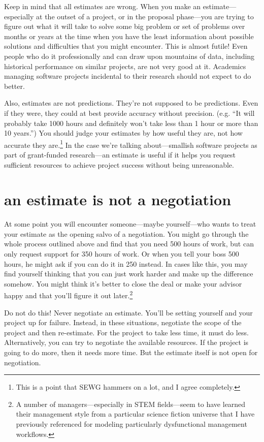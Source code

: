 \documentclass[12pt,oneside]{book}
\begin{document}
Keep in mind that all estimates are wrong. When you make an estimate---especially at the outset of a project, or in the proposal phase---you are trying to figure out what it will take to solve some big problem or set of problems over months or years at the time when you have the least information about possible solutions and difficulties that you might encounter. This is almost futile! Even people who do it professionally and can draw upon mountains of data, including historical performance on similar projects, are not very good at it. Academics managing software projects incidental to their research should not expect to do better.

Also, estimates are not predictions. They're not supposed to be predictions. Even if they were, they could at best provide accuracy without precision. (e.g. ``It will probably take 1000 hours and definitely won't take less than 1 hour or more than 10 years.'') You should judge your estimates by how useful they are, not how accurate they are.\footnote{This is a point that SEWG hammers on a lot, and I agree completely.} In the case we're talking about---smallish software projects as part of grant-funded research---an estimate is useful if it helps you request sufficient resources to achieve project success without being unreasonable.


\section*{an estimate is not a negotiation}

At some point you will encounter someone---maybe yourself---who wants to treat your estimate as the opening salvo of a negotiation. You might go through the whole process outlined above and find that you need 500 hours of work, but can only request support for 350 hours of work. Or when you tell your boss 500 hours, he might ask if you can do it in 250 instead. In cases like this, you may find yourself thinking that you can just work harder and make up the difference somehow. You might think it's better to close the deal or make your advisor happy and that you'll figure it out later.\footnote{
A number of managers—especially in STEM fields—seem to have learned their management style from a particular science fiction universe that I have previously referenced for modeling particularly dysfunctional management workflows.}

Do not do this! Never negotiate an estimate. You'll be setting yourself and your project up for failure. Instead, in these situations, negotiate the scope of the project and then re-estimate. For the project to take less time, it must do less. Alternatively, you can try to negotiate the available resources. If the project is going to do more, then it needs more time. But the estimate itself is not open for negotiation.
\end{document}
